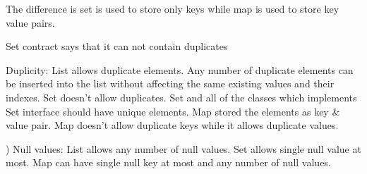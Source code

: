 The difference is set is used to store only keys while map is used to store key value pairs.


Set contract says that it can not contain duplicates



 Duplicity: List allows duplicate elements. Any number of duplicate elements can be inserted into the list without affecting the same existing values and their indexes.
Set doesn’t allow duplicates. Set and all of the classes which implements Set interface should have unique elements.
Map stored the elements as key & value pair. Map doesn’t allow duplicate keys while it allows duplicate values.

) Null values: List allows any number of null values.
Set allows single null value at most.
Map can have single null key at most and any number of null values.

